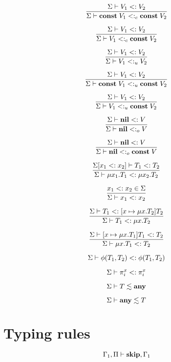 \[
\dfrac{\Sigma \vdash V_{1} <: V_{2}}
      {\Sigma \vdash \mathbf{const} \; V_{1} <:_{c} \mathbf{const} \; V_{2}}
\]

\[
\dfrac{\Sigma \vdash V_{1} <: V_{2}}
      {\Sigma \vdash V_{1} <:_{c} \mathbf{const} \; V_{2}}
\]

\[
\dfrac{\Sigma \vdash V_{1} <: V_{2}}
      {\Sigma \vdash V_{1} <:_{u} V_{2}}
\]

\[
\dfrac{\Sigma \vdash V_{1} <: V_{2}}
      {\Sigma \vdash \mathbf{const} \; V_{1} <:_{u} \mathbf{const} \; V_{2}}
\]

\[
\dfrac{\Sigma \vdash V_{1} <: V_{2}}
      {\Sigma \vdash V_{1} <:_{u} \mathbf{const} \; V_{2}}
\]

\[
\dfrac{\Sigma \vdash \mathbf{nil} <: V}
      {\Sigma \vdash \mathbf{nil} <:_{o} V}
\]

\[
\dfrac{\Sigma \vdash \mathbf{nil} <: V}
      {\Sigma \vdash \mathbf{nil} <:_{o} \mathbf{const} \; V}
\]

\[
\dfrac{\Sigma[x_{1} <: x_{2}] \vdash T_{1} <: T_{2}}
      {\Sigma \vdash \mu x_{1}.T_{1} <: \mu x_{2}.T_{2}}
\]

\[
\dfrac{x_{1} <: x_{2} \in \Sigma}
      {\Sigma \vdash x_{1} <: x_{2}}
\]

\[
\dfrac{\Sigma \vdash T_{1} <: [x \mapsto \mu x.T_{2}]T_{2}}
      {\Sigma \vdash T_{1} <: \mu x.T_{2}}
\]

\[
\dfrac{\Sigma \vdash [x \mapsto \mu x.T_{1}]T_{1} <: T_{2}}
      {\Sigma \vdash \mu x.T_{1} <: T_{2}}
\]

\[
\Sigma \vdash \phi(T_{1},T_{2}) <: \phi(T_{1},T_{2})
\]

\[
\Sigma \vdash \pi_{i}^{x} <: \pi_{i}^{x}
\]

\[
\Sigma \vdash T \lesssim \mathbf{any}
\]

\[
\Sigma \vdash \mathbf{any} \lesssim T
\]

\section{Typing rules}

\noindent

\[
\Gamma_{1}, \Pi \vdash \mathbf{skip}, \Gamma_{1}
\]

